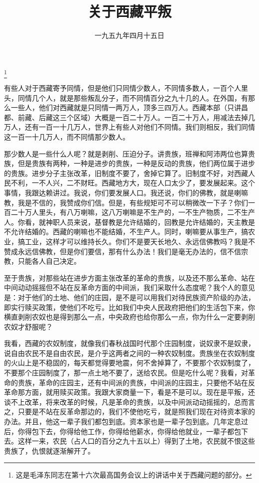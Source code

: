 
\title{关于西藏平叛}
\date{一九五九年四月十五日}
\thanks{这是毛泽东同志在第十六次最高国务会议上的讲话中关于西藏问题的部分。}
\maketitle


有些人对于西藏寄予同情，但是他们只同情少数人，不同情多数人，一百个人里头，同情几个人，就是那些叛乱分子，而不同情百分之九十几的人。在外国，有那么一些人，他们对西藏就是只同情一两万人，顶多三四万人。西藏本部（只讲昌都、前藏、后藏这三个区域）大概是一百二十万人。一百二十万人，用减法去掉几万人，还有一百一十几万人，世界上有些人对他们不同情。我们则相反，我们同情这一百一十几万人，而不同情那少数人。

那少数人是一些什么人呢？就是剥削、压迫分子。讲贵族，班禅和阿沛两位也算贵族，但是贵族有两种，一种是进步的贵族，一种是反动的贵族，他们两位属于进步的贵族。进步分子主张改革，旧制度不要了，舍掉它算了。旧制度不好，对西藏人民不利，一不人兴，二不财旺。西藏地方大，现在人口太少了，要发展起来。这个事情，我跟达赖讲过。我说，你们要发展人口。我还说，你们的佛教，就是喇嘛教，我是不信的，我赞成你们信。但是，有些规矩可不可以稍微改一下子？你们一百二十万人里头，有八万喇嘛，这八万喇嘛是不生产的，一不生产物质，二不生产人。你看，就神职人员来说，基督教是允许结婚的，回教是允许结婚的，天主教是不允许结婚的。西藏的喇嘛也不能结婚，不生产人。同时，喇嘛要从事生产，搞农业，搞工业，这样才可以维持长久。你们不是要天长地久、永远信佛教吗？我是不赞成永远信佛教，但是你们要信，那有什么办法！我们是毫无办法的，信不信宗教，只能各人自己决定。

至于贵族，对那些站在进步方面主张改革的革命的贵族，以及还不那么革命、站在中间动动摇摇但不站在反革命方面的中间派，我们采取什么态度呢？我个人的意见是：对于他们的土地、他们的庄园，是不是可以用我们对待民族资产阶级的办法，即实行赎买政策，使他们不吃亏。比如我们中央人民政府把他们的生活包下来，你横直剥削农奴也是得到那么一点，中央政府也给你那么一点，你为什么一定要剥削农奴才舒服呢？

我看，西藏的农奴制度，就像我们春秋战国时代那个庄园制度，说奴隶不是奴隶，说自由农民不是自由农民，是介乎这两者之间的一种农奴制度。贵族坐在农奴制度的火山上是不稳固的，每天都觉得要地震，何不舍掉算了，不要那个农奴制度了，不要那个庄园制度了，那一点土地不要了，送给农民。但是吃什么呢？我看，对革命的贵族，革命的庄园主，还有中间派的贵族，中间派的庄园主，只要他不站在反革命那方面，就用赎买政策。我跟大家商量一下，看是不是可以。现在是平叛，还谈不上改革，将来改革的时候，凡是革命的贵族，以及中间派动动摇摇的，总而言之，只要是不站在反革命那边的，我们不使他吃亏，就是照我们现在对待资本家的办法。并且，他这一辈子我们都包到底。资本家也是一辈子包到底。几年定息过后，你得包下去，你得给他工作，你得给他薪水，你得给他就业，一辈子都包下去。这样一来，农民（占人口的百分之九十五以上）得到了土地，农民就不恨这些贵族了，仇恨就逐渐解开了。

